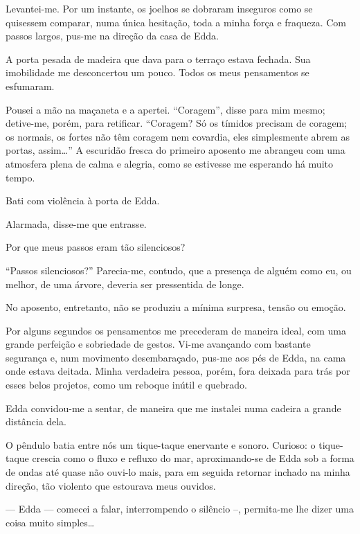 Levantei-me. Por um instante, os joelhos se dobraram inseguros como se
quisessem comparar, numa única hesitação, toda a minha força e fraqueza. Com
passos largos, pus-me na direção da casa de Edda.

A porta pesada de madeira que dava para o terraço estava fechada. Sua
imobilidade me desconcertou um pouco. Todos os meus pensamentos se
esfumaram.

Pousei a mão na maçaneta e a apertei. ``Coragem'', disse para mim mesmo;
detive-me, porém, para retificar. ``Coragem? Só os tímidos precisam de
coragem; os normais, os fortes não têm coragem nem covardia, eles
simplesmente abrem as portas, assim\ldots{}'' A escuridão fresca do primeiro
aposento me abrangeu com uma atmosfera plena de calma e alegria, como se
estivesse me esperando há muito tempo.


Bati com violência à porta de Edda.

Alarmada, disse-me que entrasse.

Por que meus passos eram tão silenciosos?

``Passos silenciosos?'' Parecia-me, contudo, que a presença de alguém como eu,
ou melhor, de uma árvore, deveria ser pressentida de longe.

No aposento, entretanto, não se produziu a mínima surpresa, tensão ou emoção.

Por alguns segundos os pensamentos me precederam de maneira ideal, com uma
grande perfeição e sobriedade de gestos. Vi-me avançando com bastante
segurança e, num movimento desembaraçado, pus-me aos pés de Edda, na cama
onde estava deitada. Minha verdadeira pessoa, porém, fora deixada para trás
por esses belos projetos, como um reboque inútil e quebrado.

Edda convidou-me a sentar, de maneira que me instalei numa cadeira a grande
distância dela.

O pêndulo batia entre nós um tique-taque enervante e sonoro. Curioso: o
tique-taque crescia como o fluxo e refluxo do mar, aproximando-se de Edda sob
a forma de ondas até quase não ouvi-lo mais, para em seguida retornar inchado
na minha direção, tão violento que estourava meus ouvidos.

--- Edda --- comecei a falar, interrompendo o silêncio --, permita-me lhe
    dizer uma coisa muito simples\ldots{}

